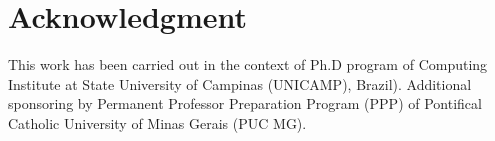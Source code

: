 \documentclass[10pt, conference]{IEEEtran}
\begin{document}
\section*{Acknowledgment}
This work has been carried out in the context of Ph.D program of  Computing Institute at State University of Campinas (UNICAMP), Brazil). Additional sponsoring by Permanent Professor Preparation Program (PPP) of Pontifical Catholic University of Minas Gerais (PUC MG). 






%
%





\end{document}
